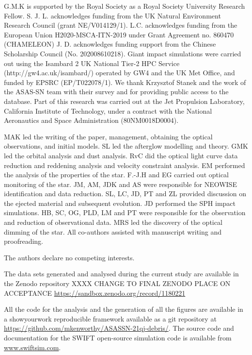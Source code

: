 \documentclass[sn-nature]{sn-jnl}%
\begin{document}
G.M.K is supported by the Royal Society as a Royal Society University Research Fellow.
%
S. J. L. acknowledges funding from the UK Natural Environment Research Council (grant NE/V014129/1).
%
L.C. acknowledges funding from the European Union H2020-MSCA-ITN-2019 under Grant Agreement no. 860470 (CHAMELEON)
%
J. D. acknowledges funding support from the Chinese Scholarship Council (No. 202008610218). Giant impact simulations were carried out using the Isambard 2 UK National Tier-2 HPC Service (http://gw4.ac.uk/isambard/) operated by GW4 and the UK Met Office, and funded by EPSRC (EP/T022078/1).
%
We thank Krzysztof Stanek and the work of the ASAS-SN team with their survey and for providing public access to the database.
%
Part of this research was carried out at the Jet Propulsion Laboratory, California Institute of Technology, under a contract with the National Aeronautics and Space Administration (80NM0018D0004).

MAK led the writing of the paper, management, obtaining the optical observations, and initial models.
%
SL led the afterglow modelling and theory.
%
GMK led the orbital analysis and dust analysis.
%
RvC did the optical light curve data reduction and reddening analysis and velocity constraint analysis.
%
EM performed the analysis of the properties of the star.
%
F.-J.H and EG carried out optical monitoring of the star.
%
JM, AM, JDK and AS were responsible for NEOWISE identification and data reduction.
%
SL, LC, JD, PT and ZL provided discussion on the ejected material and subsequent evolution.
%
JD performed the SPH impact simulations.
%
HB, SC, OG, PLD, LM and PT were responsible for the observation and reduction of observational data.
%
MRS led the discovery of the optical dimming of the star.
%
All co-authors assisted with manuscript writing and proofreading.

 The authors declare no competing interests.

The data sets generated and analysed during the current study are available in the Zenodo repository XXXX CHANGE TO FINAL ZENODO PLACE ON ACCEPTANCE \url{https://sandbox.zenodo.org/record/1180221}

All the code for the analysis and the generation of all the figures  are available in a showyourwork \citep{Luger2021} reproducible framework available as a git repository at \url{https://github.com/mkenworthy/ASASSN-21qj-debris/}.
%
The source code and documentation for the SWIFT open-source simulation code is available from \url{www.swiftsim.com}.
\end{document}
